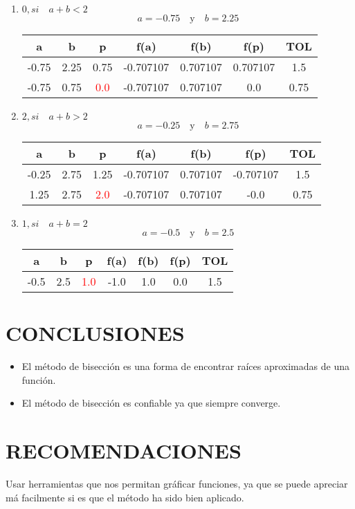 \documentclass[12pt]{article}
\begin{document}
\begin{enumerate}
    \begin{enumerate}[label=\alph*.]
        \item \(0, si \quad a+b<2\)
        \[ a = -0.75 \quad \text{y} \quad b = 2.25 \]
        \begin{tabular}{|c|c|c|c|c|c|c|}
            \hline
            \textbf{a} & \textbf{b} & \textbf{p} & \textbf{f(a)}&\textbf{f(b)}&\textbf{f(p)} &  \textbf{TOL} \\ \hline
            -0.75 & 2.25 & 0.75 & -0.707107 & 0.707107 & 0.707107 & 1.5 \\
            -0.75 & 0.75 & \textcolor{red}{0.0} & -0.707107 & 0.707107 & 0.0 & 0.75 \\
            \hline
            
        \end{tabular}
        \item \(2, si \quad a+b>2\)
        \[ a = -0.25\quad \text{y} \quad b = 2.75 \]
        \begin{tabular}{|c|c|c|c|c|c|c|}
            \hline
            \textbf{a} & \textbf{b} & \textbf{p} & \textbf{f(a)}&\textbf{f(b)}&\textbf{f(p)} &  \textbf{TOL} \\ \hline
            -0.25 & 2.75 & 1.25 & -0.707107 & 0.707107 & -0.707107 & 1.5 \\
            1.25 & 2.75 & \textcolor{red}{2.0} & -0.707107 & 0.707107 & -0.0 & 0.75 \\
            \hline
            
        \end{tabular}
        \item \(1, si \quad a+b=2\)
        \[ a = -0.5 \quad \text{y} \quad b = 2.5 \]
        \begin{tabular}{|c|c|c|c|c|c|c|}
            \hline
            \textbf{a} & \textbf{b} & \textbf{p} & \textbf{f(a)}&\textbf{f(b)}&\textbf{f(p)} &  \textbf{TOL} \\ \hline
            -0.5 & 2.5 & \textcolor{red}{1.0} & -1.0 & 1.0 & 0.0 & 1.5 \\
            \hline
            
        \end{tabular}
    \end{enumerate}
\end{enumerate}     
\section*{CONCLUSIONES}
\begin{itemize}
    \item {El método de bisección es una forma de encontrar raíces aproximadas de una función.}
    \item {El método de bisección es confiable ya que siempre converge.} 
\end{itemize}

\section*{RECOMENDACIONES}

Usar herramientas que nos permitan gráficar funciones, ya que se puede apreciar má facilmente si es que el método ha sido bien aplicado.
\renewcommand{\refname}{\MakeUppercase{REFERENCIAS}}


\end{document}
